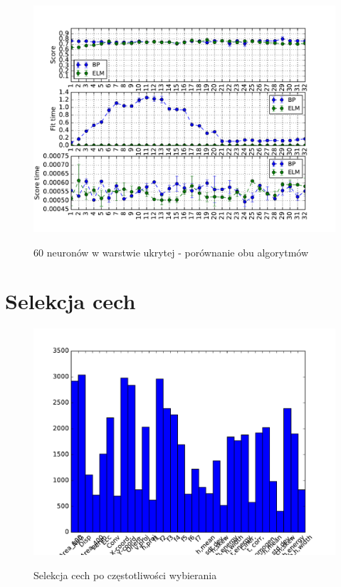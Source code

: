 \begin{figure}[h!]
	\centering
	\includegraphics[width=\linewidth]{img/bp_elm_60.pdf}
	\label{Rysunek}
	\caption{60 neuronów w warstwie ukrytej - porównanie obu algorytmów}
\end{figure}

\section{Selekcja cech}

\begin{figure}[h!]
	\centering
	\includegraphics[width=\linewidth]{img/features.pdf}
	\label{Rysunek}
	\caption{Selekcja cech po częstotliwości wybierania}
\end{figure}

